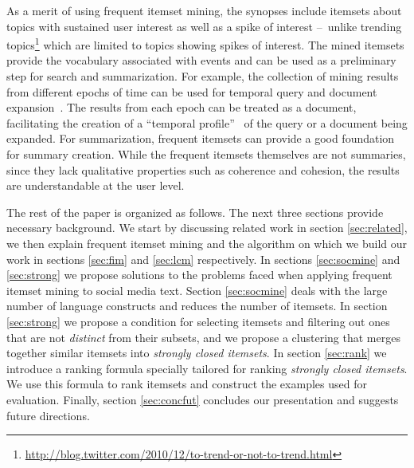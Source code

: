 \documentclass{sig-alternate}
\begin{document}


As a merit of using frequent itemset mining, the synopses include
itemsets about topics with sustained user interest as well as a spike of interest
--~unlike trending topics\footnote{\scriptsize \url{http://blog.twitter.com/2010/12/to-trend-or-not-to-trend.html}}
\cite{mathioudakis2010twittermonitor} which are limited to
topics showing spikes of interest.
The mined itemsets provide the vocabulary associated with events and can be
used as a preliminary step for search and summarization.
For example, the collection of mining results from different epochs of time
can be used for temporal query and document
expansion~\cite{choi2012temporal, efron2012improving}. %
The results from each epoch can be treated as a document, facilitating the
creation of a ``temporal profile''~\cite{jones2007temporal} of the query
or a document being expanded.
For summarization, frequent itemsets can provide a good foundation for summary
creation.
While the frequent itemsets themselves are not summaries, since they lack
qualitative properties such as coherence and cohesion, the results are
understandable at the user level.

The rest of the paper is organized as follows.
The next three sections provide necessary background.
We start by discussing related work in section \ref{sec:related},
we then explain frequent itemset mining and the algorithm on which we build
our work in sections \ref{sec:fim} and \ref{sec:lcm} respectively.
In sections \ref{sec:socmine} and \ref{sec:strong} we
propose solutions to the problems faced when applying frequent
itemset mining to social media text. 
Section \ref{sec:socmine} deals with the large number of language
constructs and reduces the number of itemsets.
In section  \ref{sec:strong} we propose a condition for selecting
itemsets and filtering out ones that are not \emph{distinct} from 
their subsets, and we propose a clustering that merges
together similar itemsets into \emph{strongly closed itemsets}.
In section \ref{sec:rank} we introduce a ranking formula
specially tailored for ranking \emph{strongly closed itemsets}.
We use this formula to rank itemsets and construct 
the examples used for evaluation. %
Finally, section \ref{sec:concfut} concludes our presentation and
suggests future directions.
\end{document}
